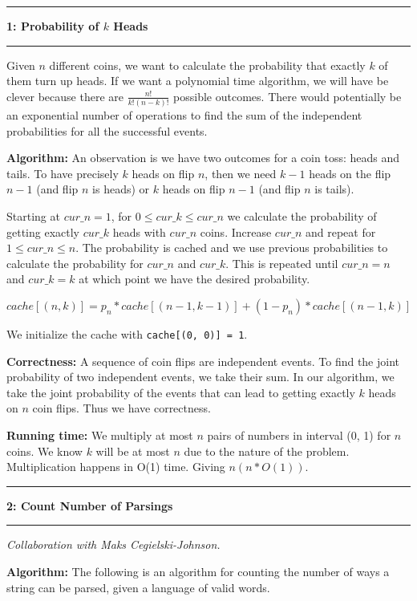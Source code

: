 \documentclass[11pt]{article}
\newcommand\question[2]{\vspace{.25in}\hrule\textbf{#1: #2}\vspace{.5em}\hrule\vspace{.10in}}
\newcommand\algorith{\vspace{.10in}\textbf{Algorithm: }}
\newcommand\correctness{\vspace{.10in}\textbf{Correctness: }}
\newcommand\runtime{\vspace{.10in}\textbf{Running time: }}
\begin{document}
\raggedright
\newcommand\NAME{Jake Pitkin}  %
\newcommand\UID{u0891770}     %
\newcommand\HWNUM{2}              %

\question{1}{Probability of $k$ Heads}
Given $n$ different coins, we want to calculate the probability that exactly $k$ of them turn up heads. If we want a polynomial time algorithm, we will have be clever because there are $\frac{n!}{k!(n-k)!}$ possible outcomes. There would potentially be an exponential number of operations to find the sum of the independent probabilities for all the successful events.

\algorith An observation is we have two outcomes for a coin toss: heads and tails. To have precisely $k$ heads on flip $n$, then we need $k-1$ heads on the flip $n-1$ (and flip $n$ is heads) or $k$ heads on flip $n-1$ (and flip $n$ is tails).

	Starting at $cur\_n = 1$, for $0 \leq cur\_k \leq cur\_n$ we calculate the probability of getting exactly $cur\_k$ heads with $cur\_n$ coins. Increase $cur\_n$ and repeat for $1 \leq cur\_n \leq n$. The probability is cached and we use previous probabilities to calculate the probability for $cur\_n$ and $cur\_k$. This is repeated until $cur\_n = n$ and $cur\_k = k$ at which point we have the desired probability.
	
	$$cache[(n, k)] = p_n * cache[(n-1, k-1)] + (1 - p_n) * cache[(n-1, k)]$$
	
	We initialize the cache with \texttt{cache[(0, 0)] = 1}.

\correctness A sequence of coin flips are independent events. To find the joint probability of two independent events, we take their sum. In our algorithm, we take the joint probability of the events that can lead to getting exactly $k$ heads on $n$ coin flips. Thus we have correctness.

\runtime We multiply at most $n$ pairs of numbers in interval (0, 1) for $n$ coins. We know $k$ will be at most $n$ due to the nature of the problem. Multiplication happens in O(1) time. Giving $n(n * O(1))$.

\newpage
\question{2}{Count Number of Parsings}
\textit{Collaboration with Maks Cegielski-Johnson.}

\algorith The following is an algorithm for counting the number of ways a string can be parsed, given a language of valid words.
\end{document}

